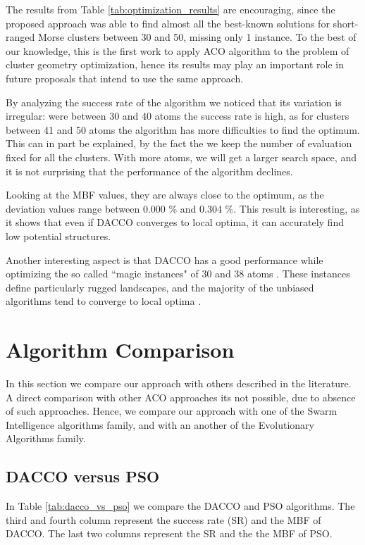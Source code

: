 	The results from Table \ref{tab:optimization_results} are encouraging, since the proposed approach was able to find almost all the best-known solutions for short-ranged Morse clusters between 30 and 50, missing only 1 instance.
	To the best of our knowledge, this is the first work to apply ACO algorithm to the problem of cluster geometry optimization, hence its results may play an important role in future proposals that intend to use the same approach.
	
	By analyzing the success rate of the algorithm we noticed that its variation is irregular: were between 30 and 40 atoms the success rate is high, as for clusters between 41 and 50 atoms the algorithm has more difficulties to find the optimum. This can in part be explained, by the fact the we keep the number of evaluation fixed for all the clusters. With more atoms, we will get a larger search space, and it is not surprising that the performance of the algorithm declines.
	
	Looking at the MBF values, they are always close to the optimum, as the deviation values range between 0.000 \% and 0.304 \%. This result is interesting, as it shows that even if DACCO converges to local optima, it can accurately find low potential structures.
	
	Another interesting aspect is that DACCO has a good performance while optimizing the so called ``magic instances" of 30 and 38 atoms \cite{doye97}. These instances define particularly rugged landscapes, and the majority of the unbiased algorithms tend to converge to local optima \cite{doye97, grosso07}.
	
	\section{Algorithm Comparison}
	In this section we compare our approach with others described in the literature. A direct comparison with other ACO approaches its not possible, due to absence of such approaches. Hence, we compare our approach with one of the Swarm Intelligence algorithms family, and with an another of the Evolutionary Algorithms family.
	
	\subsection{DACCO versus PSO}
	In Table \ref{tab:dacco_vs_pso} we compare the DACCO and PSO algorithms. The third and fourth column represent the success rate (SR) and the MBF of DACCO. The last two columns represent the SR and the the MBF of PSO. 
	
